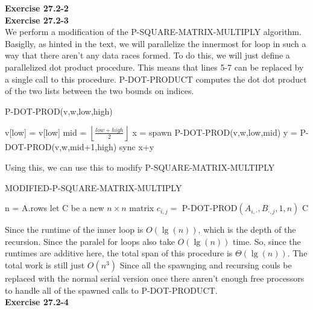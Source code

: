 \documentclass{article}
\begin{document}

\noindent\textbf{Exercise 27.2-2}\\


\noindent\textbf{Exercise 27.2-3}\\

We perform a modification of the P-SQUARE-MATRIX-MULTIPLY algorithm. Basiglly, as hinted in the text, we will parallelize the innermost for loop in such a way that there aren't any data races formed. To do this, we will just define a parallelized dot product procedure. This means that lines 5-7 can be replaced by a single call to this procedure. P-DOT-PRODUCT computes the dot dot product of the two lists between the two bounds on indices.

\begin{algorithm}
\caption{P-DOT-PROD(v,w,low,high)}
\begin{algorithmic}
\State \Return  v[low] = v[low]
\EndIf
\State mid = $\left\lfloor \frac{low+high}{2}\right\rfloor$
\State x = spawn P-DOT-PROD(v,w,low,mid)
\State y = P-DOT-PROD(v,w,mid+1,high)
\State sync
\State \Return x+y
\end{algorithmic}
\end{algorithm}

Using this, we can use this to modify P-SQUARE-MATRIX-MULTIPLY

\begin{algorithm}
\caption{MODIFIED-P-SQUARE-MATRIX-MULTIPLY}
\begin{algorithmic}
\State n = A.rows
\State let C be a new $n\times n$ matrix
\State $c_{i,j} =$ P-DOT-PROD$(A_{i,\cdot},B_{\cdot,j},1,n)$
\EndParFor
\EndParFor
\State \Return C
\end{algorithmic}
\end{algorithm}

Since the runtime of the inner loop is $O(\lg(n))$, which is the depth of the recursion. Since the paralel for loops also take $O(\lg(n))$ time. So, since the runtimes are additive here, the total span of this procedure is $\Theta(\lg(n))$. The total work is still just $O(n^3)$ Since all the spawnging and recursing couls be replaced with the normal serial version once there anren't enough free processors to handle all of the spawned calls to P-DOT-PRODUCT. \\

\noindent\textbf{Exercise 27.2-4}\\
\end{document}
